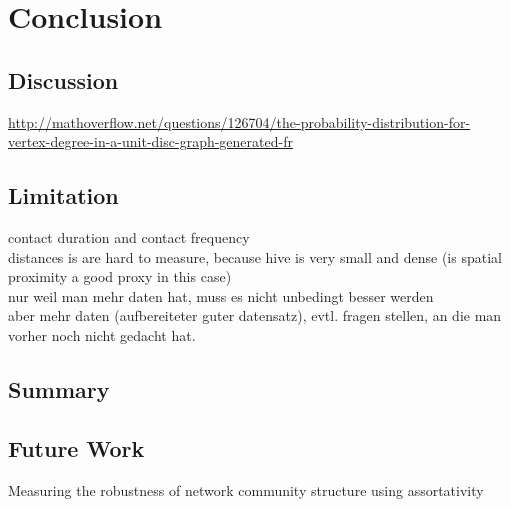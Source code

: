 \chapter{Conclusion}

\section{Discussion}
\url{http://mathoverflow.net/questions/126704/the-probability-distribution-for-vertex-degree-in-a-unit-disc-graph-generated-fr}

\section{Limitation}
contact duration and contact frequency\\
distances is are hard to measure, because hive is very small and dense (is spatial proximity a good proxy in this case)\\

nur weil man mehr daten hat, muss es nicht unbedingt besser werden\\
aber mehr daten (aufbereiteter guter datensatz), evtl. fragen stellen, an die man vorher noch nicht gedacht  hat.\\

\section{Summary}

\section{Future Work}

Measuring the robustness of network community structure using assortativity~\cite{shizuka2016measuring}
